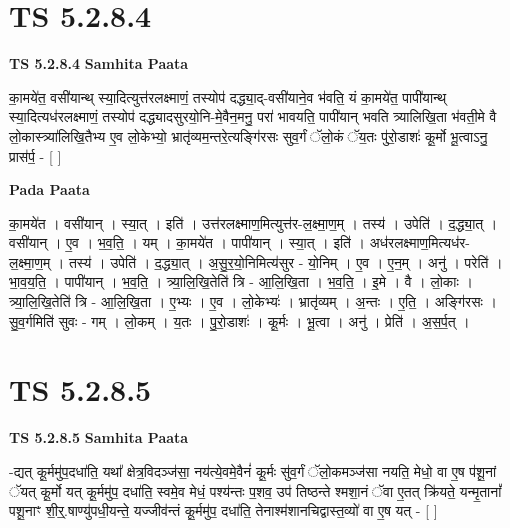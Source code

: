 \documentclass[17pt]{extarticle}
\begin{document}
\section*{ TS 5.2.8.4 }

\textbf{TS 5.2.8.4 } \newline
\textbf{Samhita Paata} \newline

का॒मये॑त॒ वसी॑यान्थ् स्या॒दित्युत्त॑रलक्ष्माणं॒ तस्योप॑ दद्ध्या॒द्-वसी॑याने॒व भ॑वति॒ यं का॒मये॑त॒ पापी॑यान्थ् स्या॒दित्यध॑रलक्ष्माणं॒ तस्योप॑ दद्ध्यादसुरयो॒नि-मे॒वैन॒मनु॒ परा॑ भावयति॒ पापी॑यान् भवति त्र्यालिखि॒ता भ॑वती॒मे वै लो॒कास्त्र्या॑लिखि॒तैभ्य ए॒व लो॒केभ्यो॒ भ्रातृ॑व्यम॒न्तरे॒त्यङ्गि॑रसः सुव॒र्गं ॅलो॒कं ॅय॒तः पु॑रो॒डाशः॑ कू॒र्मो भू॒त्वाऽनु॒ प्रास॑र्प॒ - [  ] \newline

\textbf{Pada Paata} \newline

का॒मये॑त । वसी॑यान् । स्या॒त् । इति॑ । उत्त॑रलक्ष्माण॒मित्युत्त॑र-ल॒क्ष्मा॒ण॒म् । तस्य॑ । उपेति॑ । द॒द्ध्या॒त् । वसी॑यान् । ए॒व । भ॒व॒ति॒ । यम् । का॒मये॑त । पापी॑यान् । स्या॒त् । इति॑ । अध॑रलक्ष्माण॒मित्यध॑र- ल॒क्ष्मा॒ण॒म् । तस्य॑ । उपेति॑ । द॒द्ध्या॒त् । अ॒सु॒र॒यो॒निमित्य॑सुर - यो॒निम् । ए॒व । ए॒न॒म् । अनु॑ । परेति॑ । भा॒व॒य॒ति॒ । पापी॑यान् । भ॒व॒ति॒ । त्र्या॒लि॒खि॒तेति॑ त्रि - आ॒लि॒खि॒ता । भ॒व॒ति॒ । इ॒मे । वै । लो॒काः । त्र्या॒लि॒खि॒तेति॑ त्रि - आ॒लि॒खि॒ता । ए॒भ्यः । ए॒व । लो॒केभ्यः॑ । भ्रातृ॑व्यम् । अ॒न्तः । ए॒ति॒ । अङ्गि॑रसः । सु॒व॒र्गमिति॑ सुवः - गम् । लो॒कम् । य॒तः । पु॒रो॒डाशः॑ । कू॒र्मः । भू॒त्वा । अनु॑ । प्रेति॑ । अ॒स॒र्प॒त् ।  \newline




\section*{ TS 5.2.8.5 }

\textbf{TS 5.2.8.5 } \newline
\textbf{Samhita Paata} \newline

-द्यत् कू॒र्ममु॑प॒दधा॑ति॒ यथा᳚ क्षेत्र॒विदञ्ज॑सा॒ नय॑त्ये॒वमे॒वैनं॑ कू॒र्मः सु॑व॒र्गं ॅलो॒कमञ्ज॑सा नयति॒ मेधो॒ वा ए॒ष प॑शू॒नां ॅयत् कू॒र्मो यत् कू॒र्ममु॑प॒ दधा॑ति॒ स्वमे॒व मेधं॒ पश्य॑न्तः प॒शव॒ उप॑ तिष्ठन्ते श्मशा॒नं ॅवा ए॒तत् क्रि॑यते॒ यन्मृ॒तानां᳚ पशू॒नाꣳ शी॒र्॒.षाण्यु॑पधी॒यन्ते॒ यज्जीव॑न्तं कू॒र्ममु॑प॒ दधा॑ति॒ तेनाश्म॑शानचिद्वास्त॒व्यो॑ वा ए॒ष यत् - [  ] \newline
\end{document}
